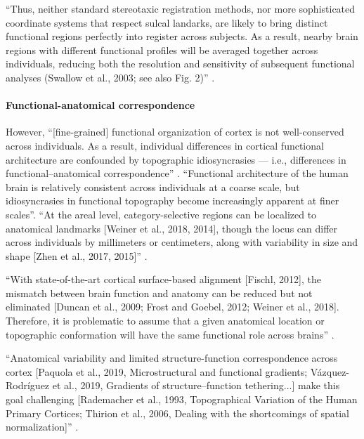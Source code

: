 %
``Thus, neither standard stereotaxic registration methods, nor more
sophisticated coordinate systems that respect sulcal landarks, are likely to
bring distinct functional regions perfectly into register across subjects. As a
result, nearby brain regions with different functional profiles will be averaged
together across individuals, reducing both the resolution and sensitivity of
subsequent functional analyses (Swallow et al., 2003; see also Fig. 2)''
\citep{saxe2006divide}.



\paragraph{Functional-anatomical correspondence}


However, ``[fine-grained] functional organization of cortex is not
well-conserved across individuals. As a result, individual differences in
cortical functional architecture are confounded by topographic idiosyncrasies
--- i.e., differences in functional--anatomical correspondence''
\citep{feilong2018reliable}.
%
``Functional architecture of the human brain is relatively consistent across
individuals at a coarse scale, but idiosyncrasies in functional topography
become increasingly apparent at finer scales''\citep{feilong2018reliable}.
``At the areal level, category-selective regions can be localized to anatomical
landmarks [Weiner et al., 2018, 2014], though the locus can differ across
individuals by millimeters or centimeters, along with variability in size and
shape [Zhen et al., 2017, 2015]'' \citep{feilong2018reliable}.

%
``With state-of-the-art cortical surface-based alignment [Fischl, 2012], the
mismatch between brain function and anatomy can be reduced but not eliminated
[Duncan et al., 2009; Frost and Goebel, 2012; Weiner et al., 2018]. Therefore,
it is problematic to assume that a given anatomical location or topographic
conformation will have the same functional role across brains''
\citep{feilong2018reliable}.

%
``Anatomical variability and limited structure-function correspondence across
cortex [Paquola et al., 2019, Microstructural and functional gradients;
Vázquez-Rodríguez et al., 2019, Gradients of structure–function tethering...]
make this goal challenging [Rademacher et al., 1993, Topographical Variation of
the Human Primary Cortices; Thirion et al., 2006, Dealing with the shortcomings
of spatial normalization]'' \citep{bazeille2021empirical}.

